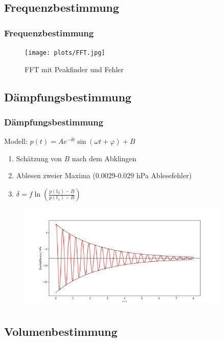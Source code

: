 \documentclass{beamer}
\begin{document}
\subsection{Frequenzbestimmung}

\begin{frame}
\frametitle{Frequenzbestimmung}

\begin{figure}
\centering
\texttt{[image: plots/FFT.jpg]}
\caption{FFT mit Peakfinder und Fehler}
\end{figure}

\end{frame}

\subsection{Dämpfungsbestimmung}

\begin{frame}
\frametitle{Dämpfungsbestimmung}

Modell: \hspace{0.2cm} $p(t) = Ae^{-\delta t} \sin(\omega t + \varphi) + B$

\begin{enumerate}[-]
\item Schätzung von $B$ nach dem Abklingen
\item Ablesen zweier Maxima (0.0029-0.029 hPa Ablesefehler)
\item $\delta = f\ln\left( \frac{p(t_0)-B}{p(t_1)-B} \right)$
\end{enumerate}

\begin{figure}
\centering
\includegraphics[width=0.9\textwidth]{plots/anpassung_delta.pdf}
\end{figure}

\end{frame}


\subsection{Volumenbestimmung}
\end{document}
